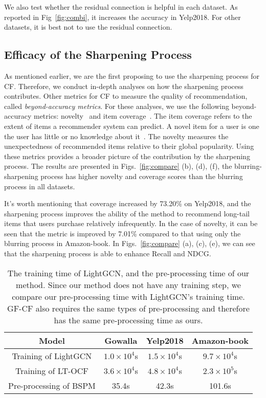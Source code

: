 \documentclass[sigconf,natbib=true]{acmart}
\begin{document}
We also test whether the residual connection is helpful in each dataset. As reported in Fig~\ref{fig:combi}, it increases the accuracy in Yelp2018. For other datasets, it is best not to use the residual connection. 


\subsection{Efficacy of the Sharpening Process}
As mentioned earlier, we are the first proposing to use the sharpening process for CF. Therefore, we conduct in-depth analyses on how the sharpening process contributes. Other metrics for CF to measure the quality of recommendation, called \emph{beyond-accuracy metrics}. For these analyses, we use the following beyond-accuracy metrics: novelty~\cite{zhou2010solving} and item coverage~\cite{Herlocker2004Coverage}. The item coverage refers to the extent of items a recommender system can predict. A novel item for a user is one the user has little or no knowledge about it~\cite{Ge2010beyond}. The novelty measures the unexpectedness of recommended items relative to their global popularity. Using these metrics provides a broader picture of the contribution by the sharpening process. The results are presented in Figs.~\ref{fig:compare} (b), (d), (f), the blurring-sharpening process has higher novelty and coverage scores than the blurring process in all datasets.


It's worth mentioning that coverage increased by 73.20\% on Yelp2018, and the sharpening process improves the ability of the method to recommend long-tail items that users purchase relatively infrequently. In the case of novelty, it can be seen that the metric is improved by 7.01\% compared to that using only the blurring process in Amazon-book. In Figs.~\ref{fig:compare} (a), (c), (e), we can see that the sharpening process is able to enhance Recall and NDCG.

\begin{table}[t]
    \small
    \setlength{\tabcolsep}{3pt}
    \centering
    \caption{The training time of LightGCN, and the pre-processing time of our method. Since our method does not have any training step, we compare our pre-processing time with LightGCN's training time. GF-CF also requires the same types of pre-processing and therefore has the same pre-processing time as ours.}
    \begin{tabular}{c c c c}\toprule
        Model  & Gowalla & Yelp2018 & Amazon-book \\
        \midrule
        Training of LightGCN    & $1.0\times10^4$s & $1.5\times10^4$s & $9.7\times10^4$s \\
        Training of LT-OCF      & $3.6\times10^4$s & $4.8\times10^4$s & $2.3\times10^5$s \\
        Pre-processing of BSPM  & 35.4s & 42.3s & 101.6s\\
        \bottomrule
    \end{tabular}
    \label{tbl:runtime1}
\end{table}
\end{document}
